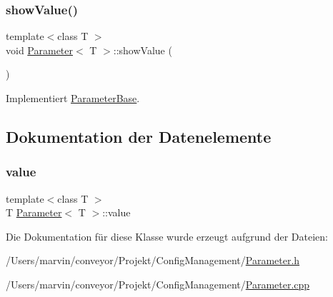 \hypertarget{class_parameter_ab0091864db90216ee76ee9084422b380}{}\label{class_parameter_ab0091864db90216ee76ee9084422b380} 
\subsubsection{\texorpdfstring{show\+Value()}{showValue()}}
{\footnotesize\ttfamily template$<$class T $>$ \\
void \hyperlink{class_parameter}{Parameter}$<$ T $>$\+::show\+Value (\begin{DoxyParamCaption}{ }\end{DoxyParamCaption})\hspace{0.3cm}{\ttfamily [virtual]}}



Implementiert \hyperlink{class_parameter_base_ad09b4d79a05987d903a7d97e16649df7}{Parameter\+Base}.



\subsection{Dokumentation der Datenelemente}
\hypertarget{class_parameter_a5dcbb3f478f204d7931eec2b3ed66117}{}\label{class_parameter_a5dcbb3f478f204d7931eec2b3ed66117} 
\subsubsection{\texorpdfstring{value}{value}}
{\footnotesize\ttfamily template$<$class T $>$ \\
T \hyperlink{class_parameter}{Parameter}$<$ T $>$\+::value}



Die Dokumentation für diese Klasse wurde erzeugt aufgrund der Dateien\+:\begin{DoxyCompactItemize}
\item 
/\+Users/marvin/conveyor/\+Projekt/\+Config\+Management/\hyperlink{_parameter_8h}{Parameter.\+h}\item 
/\+Users/marvin/conveyor/\+Projekt/\+Config\+Management/\hyperlink{_parameter_8cpp}{Parameter.\+cpp}\end{DoxyCompactItemize}
